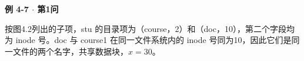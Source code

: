 {\color{ink}\bfseries 例 4-7 \(\cdot \) 第1问}\par\vspace{1bp}按图4.2列出的子项，stu 的目录项为（course，2）和（doc，10），第二个字段均为 inode 号。doc 与 course1 在同一文件系统内的 inode 号同为10，因此它们是同一文件的两个名字，共享数据块，\(x=\allowbreak{}30\)。
